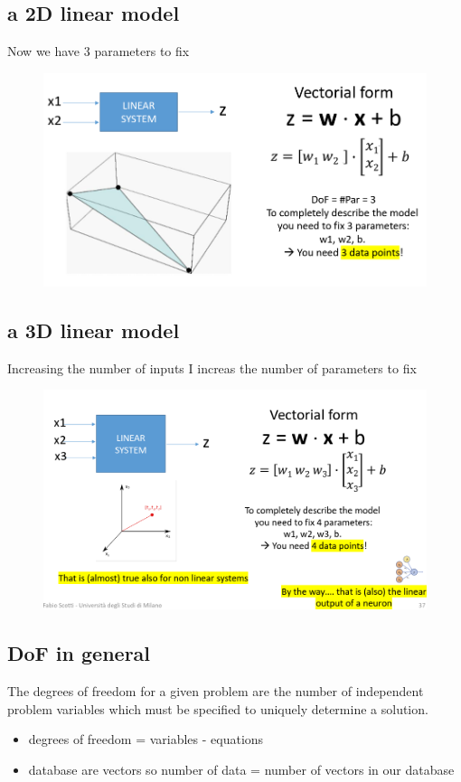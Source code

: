 \subsection{a 2D linear model}
Now we have 3 parameters to fix
\begin{figure}[H]
    \centering
    \includegraphics[width=0.8\linewidth]{07-08/images/2d.png}
\end{figure}

\subsection{a 3D linear model}
Increasing the number of inputs I increas the number of parameters to fix
\begin{figure}[H]
    \centering
    \includegraphics[width=0.8\linewidth]{07-08/images/3d.png}
\end{figure}

\subsection{DoF in general}
\noindent The degrees of freedom for a given problem are the number of independent problem variables which must be specified to uniquely determine a solution.

\begin{itemize}
    \item degrees of freedom = variables - equations
    \item database are vectors so number of data = number of vectors in our database
\end{itemize}

